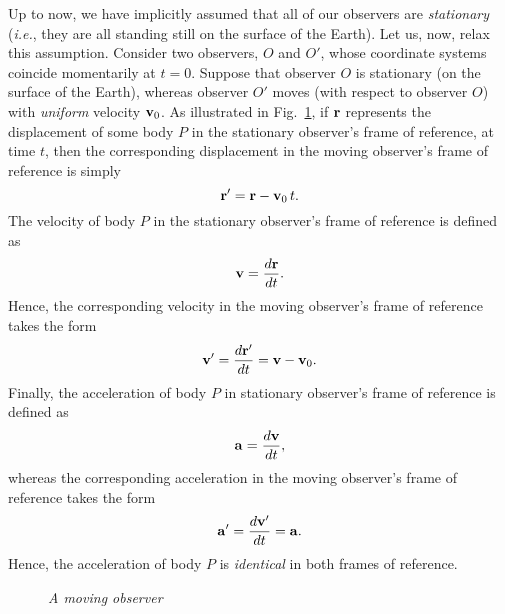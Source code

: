 Up to now, we have implicitly assumed that all of our observers are {\em stationary}
({\em i.e.}, they are all standing still on the surface of the Earth). Let us, now,
relax this assumption. Consider two observers, $O$ and $O'$, whose coordinate systems
coincide momentarily at $t=0$. Suppose that observer $O$ is stationary (on the surface of the
Earth), whereas observer $O'$ moves (with respect to observer $O$) with
{\em uniform} velocity ${\bf v}_0$.   As illustrated in Fig.~\ref{f34}, if ${\bf r}$ represents
the displacement of some body $P$ in the stationary observer's frame of reference, at time $t$, then
the corresponding displacement in the moving observer's frame of reference is simply
\begin{equation}
{\bf r}' = {\bf r} - {\bf v}_0\,t.
\end{equation}
The velocity of body $P$ in the stationary observer's frame of reference is defined as
\begin{equation}
{\bf v} = \frac{d{\bf r}}{dt}.
\end{equation}
Hence, the corresponding velocity in the moving observer's frame of reference takes the form
\begin{equation}
{\bf v}' = \frac{ d{\bf r}'}{dt} = {\bf v} - {\bf v}_0.
\end{equation}
Finally, the acceleration of body $P$ in  stationary observer's frame of reference is
defined as
\begin{equation}
{\bf a} = \frac{d{\bf v}}{dt},
\end{equation}
whereas the corresponding acceleration in the moving observer's frame of reference takes the form
\begin{equation}
{\bf a}' = \frac{ d{\bf v}'}{dt} = {\bf a}.
\end{equation}
Hence, the acceleration of body $P$ is {\em identical} in both frames of reference.

 \begin{figure}
\epsfysize=2in
\centerline{}
\caption{\em A moving observer}\label{f34}   
\end{figure}

